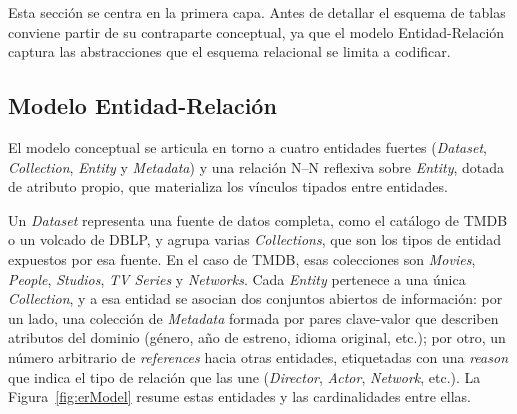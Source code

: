 Esta sección se centra en la primera capa. Antes de detallar el esquema
de tablas conviene partir de su contraparte conceptual, ya que el
modelo Entidad-Relación captura las abstracciones que el esquema
relacional se limita a codificar.

    \subsection{Modelo Entidad-Relación}

El modelo conceptual se articula en torno a cuatro entidades fuertes
(\textit{Dataset}, \textit{Collection}, \textit{Entity} y
\textit{Metadata}) y una relación N--N reflexiva sobre \textit{Entity},
dotada de atributo propio, que materializa los vínculos tipados entre
entidades.

Un \textit{Dataset} representa una fuente de datos completa, como el
catálogo de TMDB o un volcado de DBLP, y agrupa varias
\textit{Collections}, que son los tipos de entidad expuestos por esa
fuente. En el caso de TMDB, esas colecciones son \textit{Movies},
\textit{People}, \textit{Studios}, \textit{TV Series} y
\textit{Networks}. Cada \textit{Entity} pertenece a una única
\textit{Collection}, y a esa entidad se asocian dos conjuntos abiertos
de información: por un lado, una colección de \textit{Metadata} formada
por pares clave-valor que describen atributos del dominio (género, año
de estreno, idioma original, etc.); por otro, un número arbitrario de
\textit{references} hacia otras entidades, etiquetadas con una
\textit{reason} que indica el tipo de relación que las une
(\textit{Director}, \textit{Actor}, \textit{Network}, etc.). La
Figura~\ref{fig:erModel} resume estas entidades y las cardinalidades
entre ellas.

